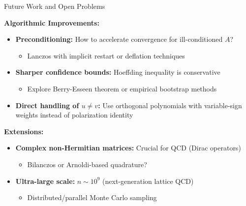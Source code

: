 \documentclass[aspectratio=169, 12pt]{beamer}
\begin{document}
\begin{frame}{Future Work and Open Problems}

\textbf{Algorithmic Improvements:}
\begin{itemize}
    \item \textbf{Preconditioning:} How to accelerate convergence for ill-conditioned \(A\)?
    \begin{itemize}
        \item Lanczos with implicit restart or deflation techniques
    \end{itemize}
    
    \item \textbf{Sharper confidence bounds:} Hoeffding inequality is conservative
    \begin{itemize}
        \item Explore Berry-Esseen theorem or empirical bootstrap methods
    \end{itemize}
    
    \item \textbf{Direct handling of \(u \neq v\):} Use orthogonal polynomials with variable-sign weights instead of polarization identity
\end{itemize}

\vspace{0.3cm}

\textbf{Extensions:}
\begin{itemize}
    \item \textbf{Complex non-Hermitian matrices:} Crucial for QCD (Dirac operators)
    \begin{itemize}
        \item Bilanczos or Arnoldi-based quadrature?
    \end{itemize}
    
    \item \textbf{Ultra-large scale:} \(n \sim 10^9\) (next-generation lattice QCD)
    \begin{itemize}
        \item Distributed/parallel Monte Carlo sampling
    \end{itemize}
\end{itemize}

\end{frame}
\end{document}

